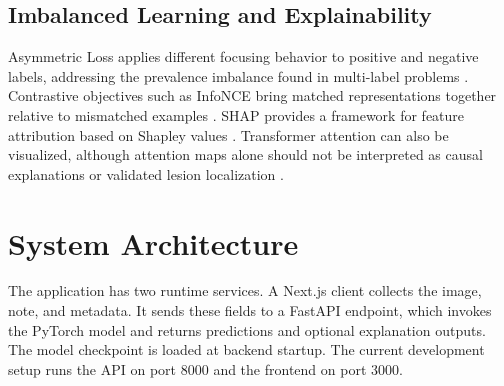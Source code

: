 \documentclass[conference]{IEEEtran}
\begin{document}
\subsection{Imbalanced Learning and Explainability}
Asymmetric Loss applies different focusing behavior to positive and negative labels, addressing the prevalence imbalance found in multi-label problems \cite{ridnik2021}. Contrastive objectives such as InfoNCE bring matched representations together relative to mismatched examples \cite{oord2018}. SHAP provides a framework for feature attribution based on Shapley values \cite{lundberg2017}. Transformer attention can also be visualized, although attention maps alone should not be interpreted as causal explanations or validated lesion localization \cite{chefer2021}.

\section{System Architecture}
The application has two runtime services. A Next.js client collects the image, note, and metadata. It sends these fields to a FastAPI endpoint, which invokes the PyTorch model and returns predictions and optional explanation outputs. The model checkpoint is loaded at backend startup. The current development setup runs the API on port 8000 and the frontend on port 3000.
\end{document}

